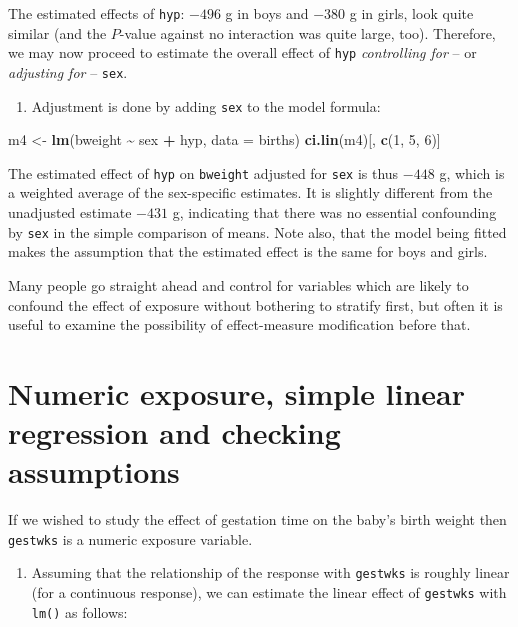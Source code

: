 \documentclass[
]{book}
\newenvironment{Shaded}{\begin{snugshade}}{\end{snugshade}}
\newcommand{\AttributeTok}[1]{\textcolor[rgb]{0.13,0.29,0.53}{#1}}
\newcommand{\DecValTok}[1]{\textcolor[rgb]{0.00,0.00,0.81}{#1}}
\newcommand{\FunctionTok}[1]{\textcolor[rgb]{0.13,0.29,0.53}{\textbf{#1}}}
\newcommand{\NormalTok}[1]{#1}
\newcommand{\OtherTok}[1]{\textcolor[rgb]{0.56,0.35,0.01}{#1}}
\newcommand{\SpecialCharTok}[1]{\textcolor[rgb]{0.81,0.36,0.00}{\textbf{#1}}}
\providecommand{\tightlist}{%
  \setlength{\itemsep}{0pt}\setlength{\parskip}{0pt}}
\begin{document}
The estimated effects of \texttt{hyp}:
\(-496\) g in boys and \(-380\) g in girls, look quite
similar (and the \(P\)-value against no interaction was quite large, too).
Therefore, we may now proceed to estimate the overall effect of \texttt{hyp}
\emph{controlling for} -- or \emph{adjusting for} -- \texttt{sex}.

\begin{enumerate}
\def\labelenumi{\arabic{enumi}.}
\tightlist
\item
  Adjustment is done by adding \texttt{sex} to the model formula:
\end{enumerate}

\begin{Shaded}
\begin{Highlighting}[]
\NormalTok{m4 }\OtherTok{\textless{}{-}} \FunctionTok{lm}\NormalTok{(bweight }\SpecialCharTok{\textasciitilde{}}\NormalTok{ sex }\SpecialCharTok{+}\NormalTok{ hyp, }\AttributeTok{data =}\NormalTok{ births)}
\FunctionTok{ci.lin}\NormalTok{(m4)[, }\FunctionTok{c}\NormalTok{(}\DecValTok{1}\NormalTok{, }\DecValTok{5}\NormalTok{, }\DecValTok{6}\NormalTok{)]}
\end{Highlighting}
\end{Shaded}

The estimated effect of \texttt{hyp} on \texttt{bweight}
adjusted for \texttt{sex} is thus \(-448\) g,
which is a weighted average of the sex-specific estimates.
It is slightly different from the unadjusted estimate \(-431\) g, indicating
that there was no essential confounding by \texttt{sex} in the
simple comparison of means.
Note also, that the model being fitted makes the assumption that
the estimated effect is the same for boys and girls.

Many people go straight ahead and control for variables which are likely to
confound the effect of exposure without bothering to stratify first,
but often it is useful to examine the possibility of effect-measure
modification before that.

\section{Numeric exposure, simple linear regression and checking assumptions}\label{numeric-exposure-simple-linear-regression-and-checking-assumptions}

If we wished to study the effect of gestation time on the baby's birth
weight then \texttt{gestwks} is a numeric exposure variable.

\begin{enumerate}
\def\labelenumi{\arabic{enumi}.}
\tightlist
\item
  Assuming that the relationship
  of the response with \texttt{gestwks} is roughly linear
  (for a continuous response),
  we can estimate the linear effect of \texttt{gestwks} with \texttt{lm()} as follows:
\end{enumerate}
\end{document}
